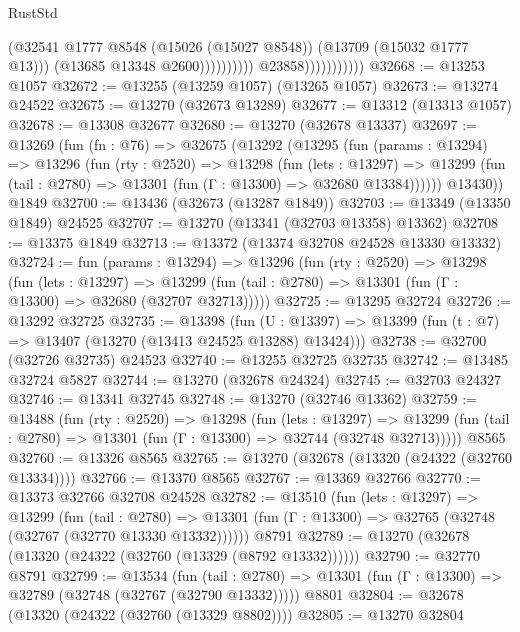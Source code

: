 \begin{lexlean}{RustStd}
\begin{coremodule}
                                            (@32541
                                              @1777
                                              @8548
                                              (@15026 (@15027 @8548))
                                              (@13709 (@15032 @1777 @13)))
                                            (@13685 @13348 @2600))))))))))
                          @23858)))))))))))
@32668 := @13253 @1057
@32672 := @13255 (@13259 @1057) (@13265 @1057)
@32673 := @13274 @24522
@32675 := @13270 (@32673 @13289)
@32677 := @13312 (@13313 @1057)
@32678 := @13308 @32677
@32680 := @13270 (@32678 @13337)
@32697 := @13269
    (fun (fn : @76) =>
    @32675
      (@13292
        (@13295
          (fun (params : @13294) =>
          @13296
            (fun (rty : @2520) =>
            @13298
              (fun (lets : @13297) =>
              @13299 (fun (tail : @2780) => @13301 (fun (Γ : @13300) => @32680 @13384))))))
        @13430))
    @1849
@32700 := @13436 (@32673 (@13287 @1849))
@32703 := @13349 (@13350 @1849) @24525
@32707 := @13270 (@13341 (@32703 @13358) @13362)
@32708 := @13375 @1849
@32713 := @13372 (@13374 @32708 @24528 @13330 @13332)
@32724 := fun (params : @13294) =>
  @13296
    (fun (rty : @2520) =>
    @13298
      (fun (lets : @13297) =>
      @13299 (fun (tail : @2780) => @13301 (fun (Γ : @13300) => @32680 (@32707 @32713)))))
@32725 := @13295 @32724
@32726 := @13292 @32725
@32735 := @13398
    (fun (U : @13397) => @13399 (fun (t : @7) => @13407 (@13270 (@13413 @24525 @13288) @13424)))
@32738 := @32700 (@32726 @32735) @24523
@32740 := @13255 @32725 @32735
@32742 := @13485 @32724 @5827
@32744 := @13270 (@32678 @24324)
@32745 := @32703 @24327
@32746 := @13341 @32745
@32748 := @13270 (@32746 @13362)
@32759 := @13488
    (fun (rty : @2520) =>
    @13298
      (fun (lets : @13297) =>
      @13299 (fun (tail : @2780) => @13301 (fun (Γ : @13300) => @32744 (@32748 @32713)))))
    @8565
@32760 := @13326 @8565
@32765 := @13270 (@32678 (@13320 (@24322 (@32760 @13334))))
@32766 := @13370 @8565
@32767 := @13369 @32766
@32770 := @13373 @32766 @32708 @24528
@32782 := @13510
    (fun (lets : @13297) =>
    @13299
      (fun (tail : @2780) =>
      @13301 (fun (Γ : @13300) => @32765 (@32748 (@32767 (@32770 @13330 @13332))))))
    @8791
@32789 := @13270 (@32678 (@13320 (@24322 (@32760 (@13329 (@8792 @13332))))))
@32790 := @32770 @8791
@32799 := @13534
    (fun (tail : @2780) => @13301 (fun (Γ : @13300) => @32789 (@32748 (@32767 (@32790 @13332)))))
    @8801
@32804 := @32678 (@13320 (@24322 (@32760 (@13329 @8802))))
@32805 := @13270 @32804

\end{coremodule}
\end{lexlean}
